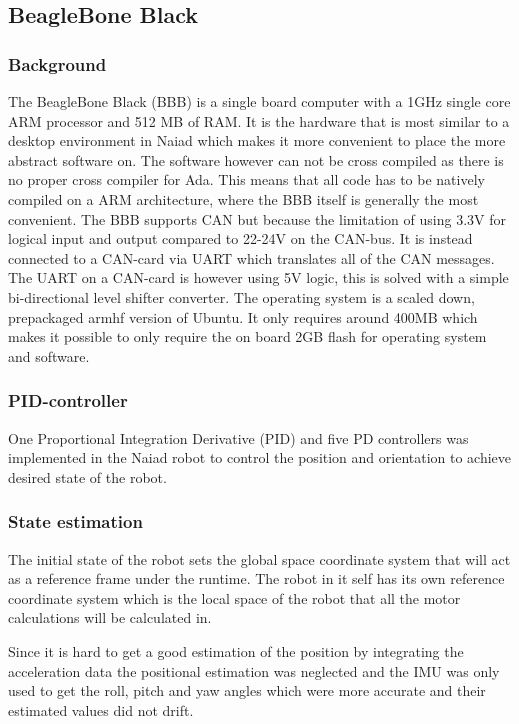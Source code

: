 \subsection{BeagleBone Black} %
		\subsubsection{Background} %
The BeagleBone Black (BBB) is a single board computer with a 1GHz single core ARM processor and 512 MB of RAM. It is the hardware that is most similar to a desktop environment in Naiad which makes it more convenient to place the more abstract software on. The software however can not be cross compiled as there is no proper cross compiler for Ada. This means that all code has to be natively compiled on a ARM architecture, where the BBB itself is generally the most convenient. The BBB supports CAN but because the limitation of using 3.3V for logical input and output compared to 22-24V on the CAN-bus. It is instead connected to a CAN-card via UART which translates all of the CAN messages. The UART on a CAN-card is however using 5V logic, this is solved with a simple bi-directional level shifter converter. The operating system is a scaled down, prepackaged armhf\cite{armhf} version of Ubuntu. It only requires around 400MB which makes it possible to only require the on board 2GB flash for operating system and software.

		\subsubsection{PID-controller} %
\noindent 
One Proportional Integration Derivative (PID) and five PD controllers was implemented in the Naiad robot to control the position and orientation to achieve desired state of the robot.
\subsubsection*{State estimation}
The initial state of the robot sets the global space coordinate system that will act as a reference frame under the runtime. The robot in it self has its own reference coordinate system which is the local space of the robot that all the motor calculations will be calculated in.

Since it is hard to get a good estimation of the position by integrating the acceleration data the positional estimation was neglected and the IMU was only used to get the roll, pitch and yaw angles which were more accurate and their estimated values did not drift.

